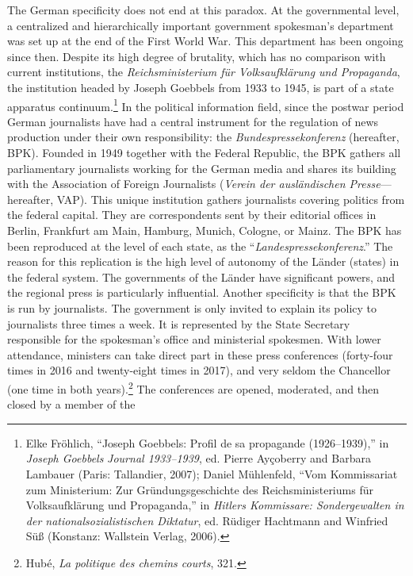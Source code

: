 \documentclass{tufte-handout}
\begin{document}
The German specificity does not end at this paradox. At the governmental
level, a centralized and hierarchically important government spokesman's
department was set up at the end of the First World War. This department
has been ongoing since then. Despite its high degree of brutality, which
has no comparison with current institutions, the \emph{Reichsministerium
für Volksaufklärung und Propaganda}, the institution headed by Joseph
Goebbels from 1933 to 1945, is part of a state apparatus
continuum.\footnote{Elke Fröhlich, ``Joseph Goebbels: Profil de sa
  propagande (1926--1939),'' in \emph{Joseph Goebbels} \emph{Journal
  1933--1939}, ed. Pierre Ayçoberry and Barbara Lambauer (Paris:
  Tallandier, 2007); Daniel Mühlenfeld, ``Vom Kommissariat zum
  Ministerium: Zur Gründungsgeschichte des Reichsministeriums für
  Volksaufklärung und Propaganda,'' in \emph{Hitlers Kommissare:
  Sondergewalten in der nationalsozialistischen Diktatur}, ed. Rüdiger
  Hachtmann and Winfried Süß (Konstanz: Wallstein Verlag, 2006).} In the
political information field, since the postwar period German journalists
have had a central instrument for the regulation of news production
under their own responsibility: the \emph{Bundespressekonferenz}
(hereafter, BPK). Founded in 1949 together with the Federal Republic,
the BPK gathers all parliamentary journalists working for the German
media and shares its building with the Association of Foreign
Journalists (\emph{Verein der ausländischen Presse}---hereafter, VAP).
This unique institution gathers journalists covering politics from the
federal capital. They are correspondents sent by their editorial offices
in Berlin, Frankfurt am Main, Hamburg, Munich, Cologne, or Mainz. The
BPK has been reproduced at the level of each state, as the
``\emph{Landespressekonferenz}.'' The reason for this replication is the
high level of autonomy of the Länder (states) in the federal system. The
governments of the Länder have significant powers, and the regional
press is particularly influential. Another specificity is that the BPK
is run by journalists. The government is only invited to explain its
policy to journalists three times a week. It is represented by the State
Secretary responsible for the spokesman's office and ministerial
spokesmen. With lower attendance, ministers can take direct part in
these press conferences (forty-four times in 2016 and twenty-eight times
in 2017), and very seldom the Chancellor (one time in both
years).\footnote{Hubé, \emph{La politique des chemins courts}, 321.} The
conferences are opened, moderated, and then closed by a member of the
\end{document}
